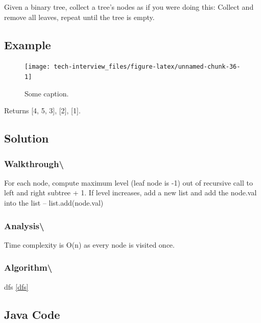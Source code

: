 \documentclass[]{book}
\begin{document}
Given a binary tree, collect a tree's nodes as if you were doing this: Collect and remove all leaves, repeat
until the tree is empty.

\hypertarget{example-69}{%
\subsection{Example}\label{example-69}}

\begin{figure}
\texttt{[image: tech-interview\_files/figure-latex/unnamed-chunk-36-1]} \caption{Some caption.}\label{fig:unnamed-chunk-36}
\end{figure}

Returns {[}4, 5, 3{]}, {[}2{]}, {[}1{]}.

\hypertarget{solution-49}{%
\subsection{Solution}\label{solution-49}}

\hypertarget{walkthrough-83}{%
\subsubsection{Walkthrough\textbackslash{}}\label{walkthrough-83}}

For each node, compute maximum level (leaf node is -1) out of recursive call to left and right subtree + 1.
If level increases, add a new list and add the node.val into the list -- list.add(node.val)

\hypertarget{analysis-90}{%
\subsubsection{Analysis\textbackslash{}}\label{analysis-90}}

Time complexity is O(n) as every node is visited once.

\hypertarget{algorithm-91}{%
\subsubsection{Algorithm\textbackslash{}}\label{algorithm-91}}

dfs \ref{dfs}

\hypertarget{java-code-53}{%
\subsection{Java Code}\label{java-code-53}}
\end{document}
